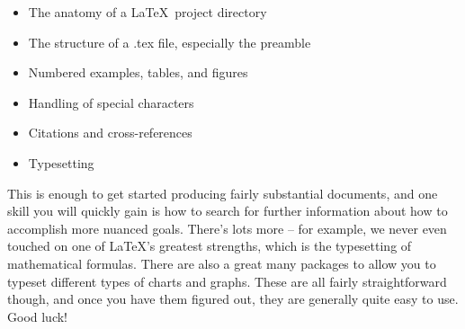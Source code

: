 \begin{itemize}
  \item The anatomy of a \LaTeX ~project directory
  \item The structure of a .tex file, especially the preamble
  \item Numbered examples, tables, and figures
  \item Handling of special characters
  \item Citations and cross-references
  \item Typesetting
\end{itemize}
This is enough to get started producing fairly substantial documents, and one
skill you will quickly gain is how to search for further information about
how to accomplish more nuanced goals. There's lots more -- for example, we
never even touched on one of \LaTeX's greatest strengths, which is the 
typesetting of mathematical formulas. There are also a great many packages to
allow you to typeset different types of charts and graphs. These are all
fairly straightforward though, and once you have them figured out, they are
generally quite easy to use. Good luck!
